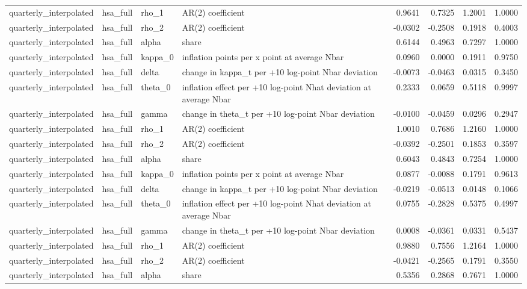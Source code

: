 \begin{tabular}{llllrrrr}
quarterly\_interpolated & hsa\_full & rho\_1 & AR(2) coefficient & 0.9641 & 0.7325 & 1.2001 & 1.0000 \\
quarterly\_interpolated & hsa\_full & rho\_2 & AR(2) coefficient & -0.0302 & -0.2508 & 0.1918 & 0.4003 \\
quarterly\_interpolated & hsa\_full & alpha & share & 0.6144 & 0.4963 & 0.7297 & 1.0000 \\
quarterly\_interpolated & hsa\_full & kappa\_0 & inflation points per x point at average Nbar & 0.0960 & 0.0000 & 0.1911 & 0.9750 \\
quarterly\_interpolated & hsa\_full & delta & change in kappa\_t per +10 log-point Nbar deviation & -0.0073 & -0.0463 & 0.0315 & 0.3450 \\
quarterly\_interpolated & hsa\_full & theta\_0 & inflation effect per +10 log-point Nhat deviation at average Nbar & 0.2333 & 0.0659 & 0.5118 & 0.9997 \\
quarterly\_interpolated & hsa\_full & gamma & change in theta\_t per +10 log-point Nbar deviation & -0.0100 & -0.0459 & 0.0296 & 0.2947 \\
quarterly\_interpolated & hsa\_full & rho\_1 & AR(2) coefficient & 1.0010 & 0.7686 & 1.2160 & 1.0000 \\
quarterly\_interpolated & hsa\_full & rho\_2 & AR(2) coefficient & -0.0392 & -0.2501 & 0.1853 & 0.3597 \\
quarterly\_interpolated & hsa\_full & alpha & share & 0.6043 & 0.4843 & 0.7254 & 1.0000 \\
quarterly\_interpolated & hsa\_full & kappa\_0 & inflation points per x point at average Nbar & 0.0877 & -0.0088 & 0.1791 & 0.9613 \\
quarterly\_interpolated & hsa\_full & delta & change in kappa\_t per +10 log-point Nbar deviation & -0.0219 & -0.0513 & 0.0148 & 0.1066 \\
quarterly\_interpolated & hsa\_full & theta\_0 & inflation effect per +10 log-point Nhat deviation at average Nbar & 0.0755 & -0.2828 & 0.5375 & 0.4997 \\
quarterly\_interpolated & hsa\_full & gamma & change in theta\_t per +10 log-point Nbar deviation & 0.0008 & -0.0361 & 0.0331 & 0.5437 \\
quarterly\_interpolated & hsa\_full & rho\_1 & AR(2) coefficient & 0.9880 & 0.7556 & 1.2164 & 1.0000 \\
quarterly\_interpolated & hsa\_full & rho\_2 & AR(2) coefficient & -0.0421 & -0.2565 & 0.1791 & 0.3550 \\
quarterly\_interpolated & hsa\_full & alpha & share & 0.5356 & 0.2868 & 0.7671 & 1.0000 \\

\end{tabular}
